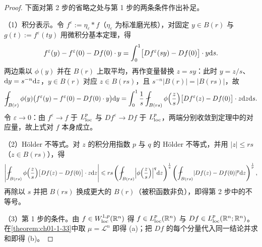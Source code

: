 \documentclass[../../main.tex]{subfiles}%
\begin{document}
\begin{proof}
下面对第 2 步的省略之处与第 1 步的两条条件作出补足。

（1）积分表示。令 $f^\varepsilon:=\eta_\varepsilon*f$（$\eta_\varepsilon$ 为标准磨光核），对固定 $y\in B(r)$ 与 $g(t):=f^\varepsilon(ty)$ 用微积分基本定理，得
\begin{align*}
f^\varepsilon(y)-f^\varepsilon(0)-Df(0)\cdot y=\int_0^1\bigl[Df^\varepsilon(sy)-Df(0)\bigr]\cdot y\mathrm{d} s.
\end{align*}
两边乘以 $\phi(y)$ 并在 $B(r)$ 上取平均，再作变量替换 $z=sy$：此时 $y=z/s$、$\mathrm{d} y=s^{-n}\mathrm{d} z$，$y\in B(r)$ 对应 $z\in B(rs)$，且 $s^{-n}\lvert B(r)\rvert=\lvert B(rs)\rvert$，故
\begin{align*}
\fint_{B(r)}\phi(y)\bigl(f^\varepsilon(y)-f^\varepsilon(0)-Df(0)\cdot y\bigr)\diff y=\int_0^1\frac{1}{s}\fint_{B(rs)}\phi\Bigl(\frac{z}{s}\Bigr)\bigl[Df^\varepsilon(z)-Df(0)\bigr]\cdot z\diff z\diff s.
\end{align*}
令 $\varepsilon\to0$：由 $f^\varepsilon\to f$ 于 $L^p_{\mathrm{loc}}$ 与 $Df^\varepsilon\to Df$ 于 $L^p_{\mathrm{loc}}$，两端分别收敛到定理中的对应量，故上式对 $f$ 本身成立。

（2）Hölder 不等式。对 $z$ 的积分用指数 $p$ 与 $q$ 的 Hölder 不等式，并用 $\lvert z\rvert\leqslant rs$（$z\in B(rs)$），得
\begin{align*}
\left\lvert\fint_{B(rs)}\phi\Bigl(\frac{z}{s}\Bigr)\bigl[Df(z)-Df(0)\bigr]\cdot z\diff z\right\rvert\leqslant rs\left(\fint_{B(rs)}\Bigl\lvert\phi\Bigl(\frac{z}{s}\Bigr)\Bigr\rvert^{q}\diff z\right)^{\frac{1}{q}}\left(\fint_{B(rs)}\lvert Df(z)-Df(0)\rvert^{p}\diff z\right)^{\frac{1}{p}},
\end{align*}
再除以 $s$ 并把 $B(rs)$ 换成更大的 $B(r)$（被积函数非负），即得第 2 步中的不等号。

（3）第 1 步的条件。由 $f\in W^{1,p}_{\mathrm{loc}}(\mathbb{R}^n)$ 得 $f\in L^p_{\mathrm{loc}}(\mathbb{R}^n)$ 与 $Df\in L^p_{\mathrm{loc}}(\mathbb{R}^n;\mathbb{R}^n)$。在\cref{theorem:ch01-1-33}中取 $\mu=\mathcal{L}^n$ 即得 (a)；把 $Df$ 的每个分量代入同一结论并求和即得 (b)。%
\end{proof}
\end{document}
